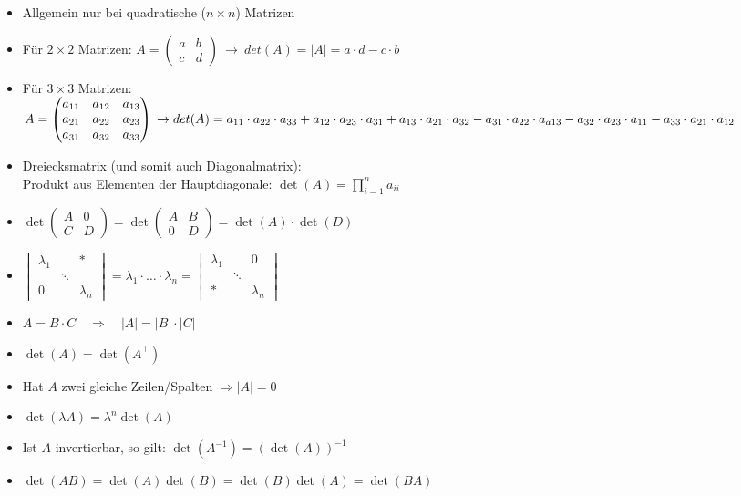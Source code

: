 \documentclass[7pt,a4paper]{scrartcl}
\newcommand{\C}{\ensuremath{\mathbb C}}
\begin{document}
\begin{multicols}{3}
\begin{itemize}\itemsep0pt
	\item Allgemein nur bei quadratische ($n \times n$) Matrizen
	\item Für $2 \times 2$ Matrizen: $A=\begin{pmatrix}	a & b \\ c & d 	\end{pmatrix} ~ \rightarrow ~ det(A)=|A|=a \cdot d - c \cdot b$
	\item Für $3 \times 3$ Matrizen: $A=\begin{pmatrix}
	a_{11} & a_{12} & a_{13} \\
	a_{21} & a_{22} & a_{23} \\
	a_{31} & a_{32} & a_{33}
	\end{pmatrix}
	\\\rightarrow det(A)=a_{11} \cdot a_{22} \cdot a_{33}+a_{12} \cdot a_{23} \cdot a_{31}+a_{13} \cdot a_{21} \cdot a_{32}-a_{31} \cdot a_{22} \cdot a_{a13}-a_{32} \cdot a_{23} \cdot a_{11}-a_{33} \cdot a_{21} \cdot a_{12}$
	\item Dreiecksmatrix (und somit auch Diagonalmatrix): \\
	Produkt aus Elementen der Hauptdiagonale: $\det(A)=\prod\limits_{i=1}^{n} a_{ii}$
	\item $\det\begin{pmatrix}A&0\\C&D\end{pmatrix}=\det\begin{pmatrix}A&B\\0&D\end{pmatrix}=\det(A)\cdot\det(D)$
	\item $\begin{vmatrix}\lambda_1&&* \\ &\ddots& \\ 0&&\lambda_n \end{vmatrix} = \lambda_1\cdot \ldots\cdot \lambda_n = \begin{vmatrix} \lambda_1&&0  \\  &\ddots& \\  *&&\lambda_n \end{vmatrix}$
	\item $A=B \cdot C \quad \Rightarrow \quad |A|=|B| \cdot |C|$
	\item $\det(A)=\det(A^\top)$
	\item Hat $A$ zwei gleiche Zeilen/Spalten $\Rightarrow |A|=0$
	\item $\det(\lambda A)=\lambda^n \det(A)$
	\item Ist $A$ invertierbar, so gilt: $\det(A^{-1})=(\det(A))^{-1}$
	\item $\det(AB) = \det(A) \det(B) = \det(B) \det(A) = \det(BA)$
\end{itemize}


\end{multicols}
\end{document}
